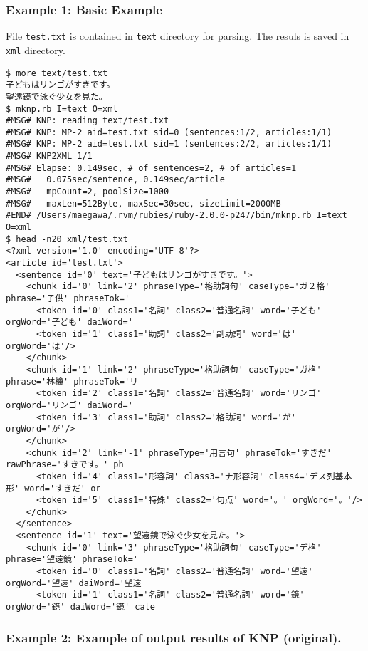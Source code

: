 \subsubsection*{Example 1: Basic Example }

File \verb|test.txt| is contained in \verb|text| directory for parsing. 
The resuls is saved in \verb|xml| directory.  

\begin{Verbatim}[baselinestretch=0.7,frame=single]
$ more text/test.txt
子どもはリンゴがすきです。
望遠鏡で泳ぐ少女を見た。
$ mknp.rb I=text O=xml
#MSG# KNP: reading text/test.txt
#MSG# KNP: MP-2 aid=test.txt sid=0 (sentences:1/2, articles:1/1)
#MSG# KNP: MP-2 aid=test.txt sid=1 (sentences:2/2, articles:1/1)
#MSG# KNP2XML 1/1
#MSG# Elapse: 0.149sec, # of sentences=2, # of articles=1
#MSG#   0.075sec/sentence, 0.149sec/article
#MSG#   mpCount=2, poolSize=1000
#MSG#   maxLen=512Byte, maxSec=30sec, sizeLimit=2000MB
#END# /Users/maegawa/.rvm/rubies/ruby-2.0.0-p247/bin/mknp.rb I=text O=xml
$ head -n20 xml/test.txt
<?xml version='1.0' encoding='UTF-8'?>
<article id='test.txt'>
  <sentence id='0' text='子どもはリンゴがすきです。'>
    <chunk id='0' link='2' phraseType='格助詞句' caseType='ガ２格' phrase='子供' phraseTok='
      <token id='0' class1='名詞' class2='普通名詞' word='子ども' orgWord='子ども' daiWord='
      <token id='1' class1='助詞' class2='副助詞' word='は' orgWord='は'/>
    </chunk>
    <chunk id='1' link='2' phraseType='格助詞句' caseType='ガ格' phrase='林檎' phraseTok='リ
      <token id='2' class1='名詞' class2='普通名詞' word='リンゴ' orgWord='リンゴ' daiWord='
      <token id='3' class1='助詞' class2='格助詞' word='が' orgWord='が'/>
    </chunk>
    <chunk id='2' link='-1' phraseType='用言句' phraseTok='すきだ' rawPhrase='すきです。' ph
      <token id='4' class1='形容詞' class3='ナ形容詞' class4='デス列基本形' word='すきだ' or
      <token id='5' class1='特殊' class2='句点' word='。' orgWord='。'/>
    </chunk>
  </sentence>
  <sentence id='1' text='望遠鏡で泳ぐ少女を見た。'>
    <chunk id='0' link='3' phraseType='格助詞句' caseType='デ格' phrase='望遠鏡' phraseTok='
      <token id='0' class1='名詞' class2='普通名詞' word='望遠' orgWord='望遠' daiWord='望遠
      <token id='1' class1='名詞' class2='普通名詞' word='鏡' orgWord='鏡' daiWord='鏡' cate
\end{Verbatim}
\subsubsection*{Example 2: Example of output results of KNP (original). }

